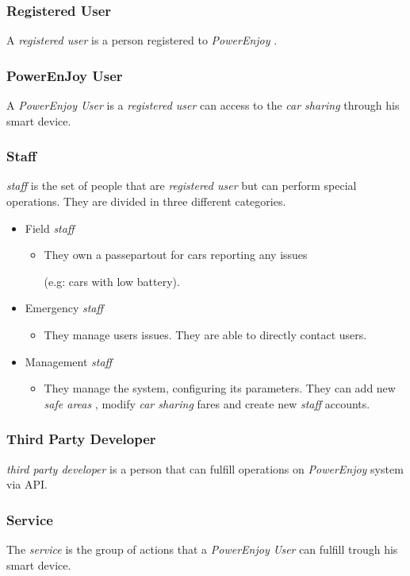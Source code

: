 \documentclass[english]{article}
\newcommand{\carsharing}{\textit {car sharing }}
\newcommand{\powerenjoy}{\textit{PowerEnjoy }}
\newcommand{\registereduser}{\textit {registered user }}
\newcommand{\powerenjoyuser}{\textit{PowerEnjoy User }}
\newcommand{\staff}{\textit{staff }}
\newcommand{\service}{\textit{service }}
\newcommand{\safeareas}{\textit{safe areas }}
\newcommand{\thirdparty}{\textit{third party developer }}
\begin{document}
		\subsubsection{Registered User} 
			A \registereduser is a person registered to \powerenjoy.
		\subsubsection{PowerEnJoy User}
			A \powerenjoyuser is a \registereduser can access to the \carsharing through his smart device.
		\subsubsection{Staff}
			\staff is the set of people that are \registereduser  but can perform special operations. They are divided in three different categories.
			\begin{itemize}
				\item {Field \staff}
				\begin{itemize}
				\item They own a passepartout for cars reporting any issues \\ \par (e.g: cars with low battery).
				\end{itemize}
				\item{Emergency \staff}
				\begin{itemize}
				\item They manage users issues. They are able to directly contact users.
				\end{itemize}
				\item{Management \staff}
				\begin{itemize}
				\item They manage the system, configuring its parameters. They can add new \safeareas, modify \carsharing fares and create new \staff accounts.
				\end{itemize}
			\end{itemize}
		\subsubsection{Third Party Developer}
			\thirdparty is a person that can fulfill operations on \powerenjoy system via API.
		\subsubsection{Service}
			The \service is the group of actions that a \powerenjoyuser can fulfill trough his smart device.	
\end{document}
